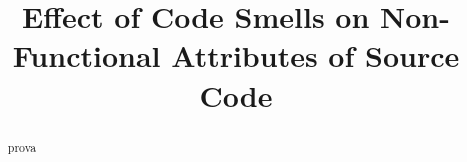 \documentclass[sigconf]{acmart},
\title{Effect of Code Smells on Non-Functional Attributes of Source Code}
\author{}
\begin{document}
\maketitle

\begin{abstract}
	prova
\end{abstract}

\section{}
\end{document}
